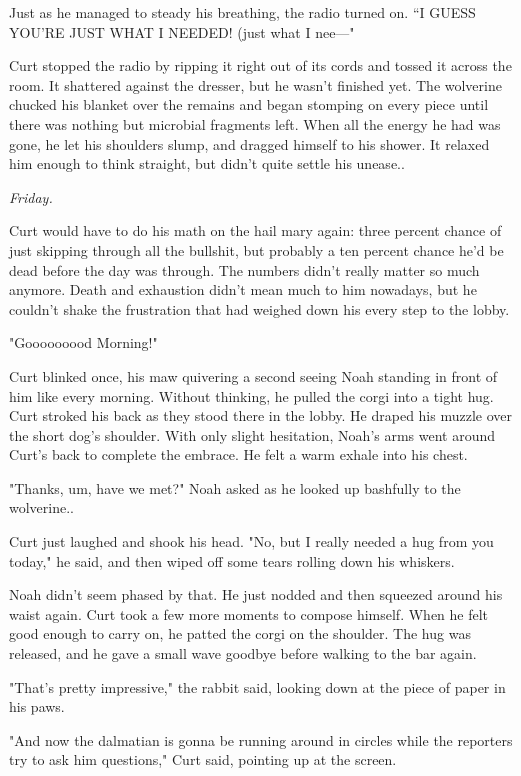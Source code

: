 Just as he managed to steady his breathing, the radio turned on. ``I GUESS YOU'RE JUST WHAT I NEEDED! (just what I nee---"

Curt stopped the radio by ripping it right out of its cords and tossed it across the room. It shattered against the dresser, but he wasn't finished yet. The wolverine chucked his blanket over the remains and began stomping on every piece until there was nothing but microbial fragments left. When all the energy he had was gone, he let his shoulders slump, and dragged himself to his shower. It relaxed him enough to think straight, but didn't quite settle his unease..

\emph{Friday.}

Curt would have to do his math on the hail mary again: three percent chance of just skipping through all the bullshit, but probably a ten percent chance he'd be dead before the day was through. The numbers didn't really matter so much anymore. Death and exhaustion didn't mean much to him nowadays, but he couldn't shake the frustration that had weighed down his every step to the lobby.

"Gooooooood Morning!"

Curt blinked once, his maw quivering a second seeing Noah standing in front of him like every morning. Without thinking, he pulled the corgi into a tight hug. Curt stroked his back as they stood there in the lobby. He draped his muzzle over the short dog's shoulder. With only slight hesitation, Noah's arms went around Curt's back to complete the embrace. He felt a warm exhale into his chest.

"Thanks, um, have we met?" Noah asked as he looked up bashfully to the wolverine..

Curt just laughed and shook his head. "No, but I really needed a hug from you today," he said, and then wiped off some tears rolling down his whiskers.

Noah didn't seem phased by that. He just nodded and then squeezed around his waist again. Curt took a few more moments to compose himself. When he felt good enough to carry on, he patted the corgi on the shoulder. The hug was released, and he gave a small wave goodbye before walking to the bar again.

\secdiv

"That's pretty impressive," the rabbit said, looking down at the piece of paper in his paws.

"And now the dalmatian is gonna be running around in circles while the reporters try to ask him questions," Curt said, pointing up at the screen.

